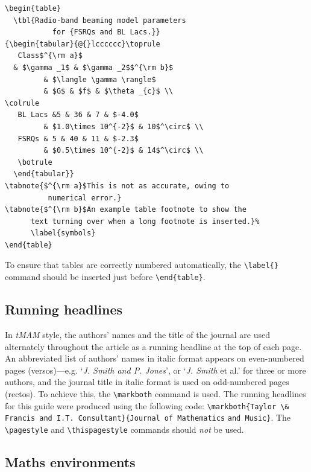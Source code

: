 \documentclass[]{tMAM2e}
\begin{document}
\begin{verbatim}
\begin{table}
  \tbl{Radio-band beaming model parameters
           for {FSRQs and BL Lacs.}}
{\begin{tabular}{@{}lcccccc}\toprule
   Class$^{\rm a}$
  & $\gamma _1$ & $\gamma _2$$^{\rm b}$
         & $\langle \gamma \rangle$
         & $G$ & $f$ & $\theta _{c}$ \\
\colrule
   BL Lacs &5 & 36 & 7 & $-4.0$
         & $1.0\times 10^{-2}$ & 10$^\circ$ \\
   FSRQs & 5 & 40 & 11 & $-2.3$
         & $0.5\times 10^{-2}$ & 14$^\circ$ \\
   \botrule
  \end{tabular}}
\tabnote{$^{\rm a}$This is not as accurate, owing to
          numerical error.}
\tabnote{$^{\rm b}$An example table footnote to show the
      text turning over when a long footnote is inserted.}%
      \label{symbols}
\end{table}
\end{verbatim}

To ensure that tables are correctly numbered automatically, the
\verb"\label{}" command should be inserted just before
\verb"\end{table}".

\subsection{Running headlines}\label{markboth}

In {\it tMAM} style, the authors' names and the title of the journal are used alternately throughout the article as a running headline at the top of each page. An abbreviated list of authors' names in italic format appears on even-numbered pages (versos)---e.g. `{\em J. Smith and P. Jones}', or `{\em J. Smith} et al.' for three or more authors, and the journal title in italic format is used on odd-numbered pages (rectos). To achieve this, the \verb"\markboth" command is used. The running headlines for this guide were produced using the following code:
\verb"\markboth{Taylor \& Francis and I.T. Consultant}{Journal of Mathematics"
\verb"and Music}". The \verb"\pagestyle" and \verb"\thispagestyle" commands should {\it not\/} be used.

\subsection{Maths environments}
\end{document}

